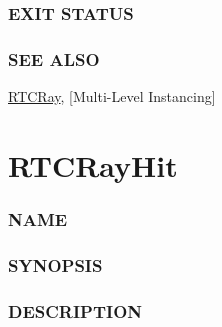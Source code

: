 \subsubsection{EXIT STATUS}\label{exit-status}

\subsubsection{SEE ALSO}\label{see-also}

\hyperref[rtcray]{RTCRay}, {[}Multi-Level Instancing{]}

\pagebreak

\section{RTCRayHit}\label{rtcrayhit}

\subsubsection{NAME}\label{name}

\begin{Shaded}
\begin{Highlighting}[]
\OperatorTok{{-}}\OperatorTok{/}
\end{Highlighting}
\end{Shaded}

\subsubsection{SYNOPSIS}\label{synopsis}

\begin{Shaded}
\begin{Highlighting}[]

\OperatorTok{(}\OperatorTok{)}
\OperatorTok{\{}
  \OperatorTok{;}
  \OperatorTok{;}
\OperatorTok{\};}
\end{Highlighting}
\end{Shaded}

\subsubsection{DESCRIPTION}\label{description}

